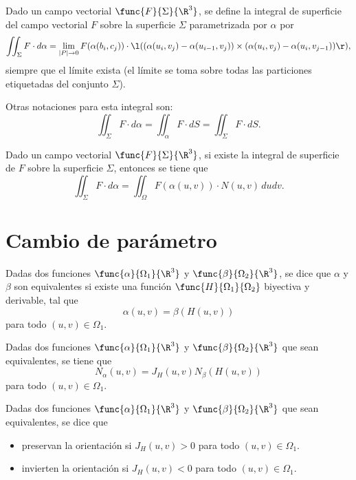 \documentclass[a4,11pt]{aleph-notas}
\begin{document}
\begin{defi}
    Dado un campo vectorial $\func{F}{\Sigma}{\R^3}$, se define la integral de superficie del campo vectorial $F$ sobre la superficie $\Sigma$ parametrizada por $\alpha$ por
    \[
        \iint_\Sigma F\cdot d\alpha
        = \lim_{|P|\to 0} F(\alpha(b_i,c_j)) \cdot\l( (\alpha(u_i,v_j)- \alpha(u_{i-1},v_j)) \times (\alpha(u_i,v_j)- \alpha(u_i,v_{j-1}))\r),
    \]
    siempre que el límite exista (el límite se toma sobre todas las particiones etiquetadas del conjunto $\Sigma$).
\end{defi}

\begin{advertencia}
    Otras notaciones para esta integral son:
    \[
        \iint_\Sigma F\cdot d\alpha
        = \iint_\alpha F \cdot dS
        = \iint_\Sigma F \cdot dS.
    \]
\end{advertencia}

\begin{teo}
    Dado un campo vectorial $\func{F}{\Sigma}{\R^3}$, si existe la integral de superficie de $F$ sobre la superficie $\Sigma$, entonces se tiene que
    \[
        \iint_\Sigma F\cdot d\alpha
        =\iint_\Omega F(\alpha(u,v))\cdot N(u,v)\,dudv.
    \]
\end{teo}

\section{Cambio de parámetro}

\begin{defi}
    Dadas dos funciones $\func{\alpha}{\Omega_1}{\R^3}$ y $\func{\beta}{\Omega_2}{\R^3}$, se dice que $\alpha$ y $\beta$ son equivalentes si existe una función $\func{H}{\Omega_1}{\Omega_2}$ biyectiva y derivable, tal que
    \[
        \alpha(u,v)=\beta(H(u,v))
    \]
    para todo $(u,v)\in \Omega_1$.
\end{defi}

\begin{prop}
    Dadas dos funciones $\func{\alpha}{\Omega_1}{\R^3}$ y $\func{\beta}{\Omega_2}{\R^3}$ que sean equivalentes, se tiene que
    \[
        N_\alpha(u,v) = J_H(u,v) N_\beta(H(u,v))
    \]
    para todo $(u,v)\in \Omega_1$.
\end{prop}

\begin{defi}
    Dadas dos funciones $\func{\alpha}{\Omega_1}{\R^3}$ y $\func{\beta}{\Omega_2}{\R^3}$ que sean equivalentes, se dice que
    \begin{itemize}
        \item preservan la orientación si $J_H(u,v)>0$ para todo $(u,v)\in \Omega_1$.
        \item invierten la orientación si $J_H(u,v)<0$ para todo $(u,v)\in \Omega_1$.
    \end{itemize}
\end{defi}
\end{document}
